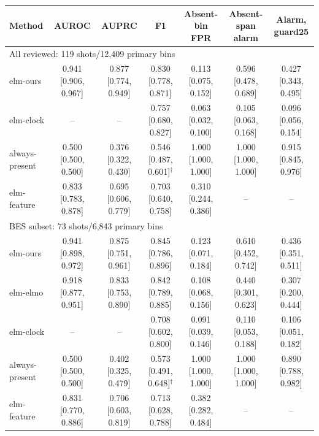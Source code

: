 \begin{table}[t]
\centering
\small
\footnotesize\setlength{\tabcolsep}{2.5pt}
\begin{tabular}{lcccccc}
\toprule
Method & AUROC & AUPRC & F1 & Absent-bin FPR & Absent-span alarm & Alarm, guard25 \\
\midrule
\multicolumn{7}{l}{All reviewed: 119 shots/12,409 primary bins} \\
elm-ours & 0.941 {\scriptsize[0.906, 0.967]} & 0.877 {\scriptsize[0.774, 0.949]} & 0.830 {\scriptsize[0.778, 0.871]} & 0.113 {\scriptsize[0.075, 0.152]} & 0.596 {\scriptsize[0.478, 0.689]} & 0.427 {\scriptsize[0.343, 0.495]} \\
elm-clock & -- & -- & 0.757 {\scriptsize[0.680, 0.827]} & 0.063 {\scriptsize[0.032, 0.100]} & 0.105 {\scriptsize[0.063, 0.168]} & 0.096 {\scriptsize[0.056, 0.154]} \\
always-present & 0.500 {\scriptsize[0.500, 0.500]} & 0.376 {\scriptsize[0.322, 0.430]} & 0.546 {\scriptsize[0.487, 0.601]}$^{\dagger}$ & 1.000 {\scriptsize[1.000, 1.000]} & 1.000 {\scriptsize[1.000, 1.000]} & 0.915 {\scriptsize[0.845, 0.976]} \\
elm-feature & 0.833 {\scriptsize[0.783, 0.878]} & 0.695 {\scriptsize[0.606, 0.779]} & 0.703 {\scriptsize[0.640, 0.758]} & 0.310 {\scriptsize[0.244, 0.386]} & -- & -- \\
\midrule
\multicolumn{7}{l}{BES subset: 73 shots/6,843 primary bins} \\
elm-ours & 0.941 {\scriptsize[0.898, 0.972]} & 0.875 {\scriptsize[0.751, 0.961]} & 0.845 {\scriptsize[0.786, 0.896]} & 0.123 {\scriptsize[0.071, 0.184]} & 0.610 {\scriptsize[0.452, 0.742]} & 0.436 {\scriptsize[0.351, 0.511]} \\
elm-elmo & 0.918 {\scriptsize[0.877, 0.951]} & 0.833 {\scriptsize[0.753, 0.890]} & 0.842 {\scriptsize[0.789, 0.885]} & 0.108 {\scriptsize[0.068, 0.156]} & 0.440 {\scriptsize[0.301, 0.623]} & 0.307 {\scriptsize[0.200, 0.444]} \\
elm-clock & -- & -- & 0.708 {\scriptsize[0.602, 0.800]} & 0.091 {\scriptsize[0.039, 0.146]} & 0.110 {\scriptsize[0.053, 0.188]} & 0.106 {\scriptsize[0.051, 0.182]} \\
always-present & 0.500 {\scriptsize[0.500, 0.500]} & 0.402 {\scriptsize[0.325, 0.479]} & 0.573 {\scriptsize[0.491, 0.648]}$^{\dagger}$ & 1.000 {\scriptsize[1.000, 1.000]} & 1.000 {\scriptsize[1.000, 1.000]} & 0.890 {\scriptsize[0.788, 0.982]} \\
elm-feature & 0.831 {\scriptsize[0.770, 0.886]} & 0.706 {\scriptsize[0.603, 0.819]} & 0.713 {\scriptsize[0.628, 0.788]} & 0.382 {\scriptsize[0.282, 0.484]} & -- & -- \\

\end{tabular}
\end{table}
